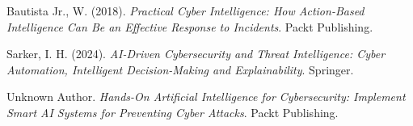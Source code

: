 \documentclass[10pt,a4paper]{article}
\begin{document}

\begin{thebibliography}{9}

Bautista Jr., W. (2018).
\textit{Practical Cyber Intelligence: How Action-Based Intelligence Can Be an Effective Response to Incidents}.
Packt Publishing.

Sarker, I. H. (2024).
\textit{AI-Driven Cybersecurity and Threat Intelligence: Cyber Automation, Intelligent Decision-Making and Explainability}.
Springer.

Unknown Author.
\textit{Hands-On Artificial Intelligence for Cybersecurity: Implement Smart AI Systems for Preventing Cyber Attacks}.
Packt Publishing.

\end{thebibliography}
\end{document}
